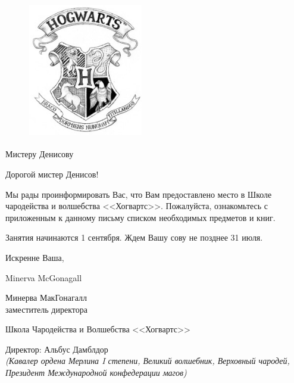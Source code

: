\documentclass[12pt,a4paper, oneside]{report}
\newcommand{\newsize}[1]{{\fontsize{12}{1}\selectfont #1 }}
\begin{document}
	
\pagestyle{empty}

\begin{figure}
	\centering
	\includegraphics[height=6cm, width=5cm]{hgw.png}
\end{figure}
		
\vspace{1cm}

\newsize{ Мистеру Денисову } 
			
\vspace{2.5cm}

Дорогой мистер Денисов! 
			
Мы рады проинформировать Вас, что Вам предоставлено место в Школе чародейства и волшебства <<Хогвартс>>. Пожалуйста, ознакомьтесь с приложенным к данному письму списком необходимых предметов и книг. 
			
Занятия начинаются 1 сентября. Ждем Вашу сову не позднее 31 июля. 
			
Искренне Ваша,


\newenvironment{hfont}{\myfont}{\par}
\begin{hfont}
{\fontsize{20}{1}\selectfont Minerva McGonagall}
\end{hfont}
			
Минерва МакГонагалл \\ заместитель директора
		

\vfill
\begin{center}
Школа Чародейства и Волшебства <<Хогвартс>>  

\newsize{ Директор: Альбус Дамблдор \\ \textit{ (Кавалер ордена Мерлина I степени, Великий волшебник, Верховный чародей, Президент Международной конфедерации магов)} }
\end{center}	
\end{document}
